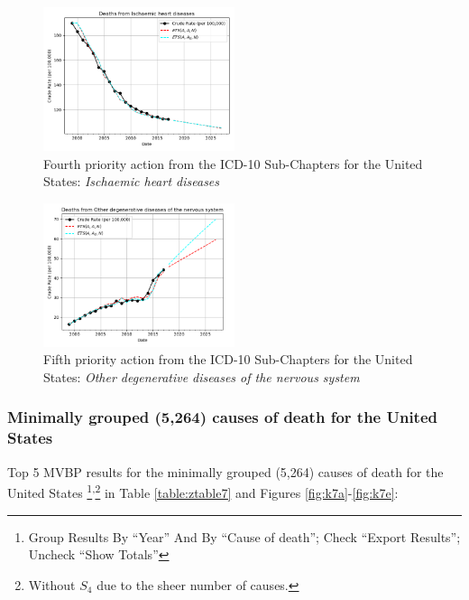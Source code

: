 \documentclass[10pt, a4paper, twocolumn]{IEEEconf}
\newcommand\footnotesstartsep{}
\newcommand\footnotescontinue{\textsuperscript{,}}
\begin{document}
\begin{figure}[H]
  \centering
  \includegraphics[width=0.5\textwidth]{results/US_ICD10_SUB_CHAPTERS/Ischaemic_heart_diseases_ets.png}
  \caption{Fourth priority action from the ICD-10 Sub-Chapters for the United States: \textit{Ischaemic heart diseases}}\label{fig:k6d}
\end{figure}
  
\begin{figure}[H]
  \centering
  \includegraphics[width=0.5\textwidth]{results/US_ICD10_SUB_CHAPTERS/Other_degenerative_diseases_of_the_nervous_system_ets.png}
  \caption{Fifth priority action from the ICD-10 Sub-Chapters for the United States: \textit{Other degenerative diseases of the nervous system}}\label{fig:k6e}
\end{figure}
  
\clearpage

\subsubsection{Minimally grouped (5,264) causes of death for the United States}

Top 5 MVBP results for the minimally grouped (5,264) causes of death for the United States \citep{centers2017underlying}\footnotesstartsep\footnote{Group Results By \enquote{Year} And By \enquote{Cause of death}; Check \enquote{Export Results}; Uncheck \enquote{Show Totals}}\footnotescontinue\footnote{Without $S_4$ due to the sheer number of causes.} in Table \ref{table:ztable7} and Figures \ref{fig:k7a}-\ref{fig:k7e}:
\end{document}
